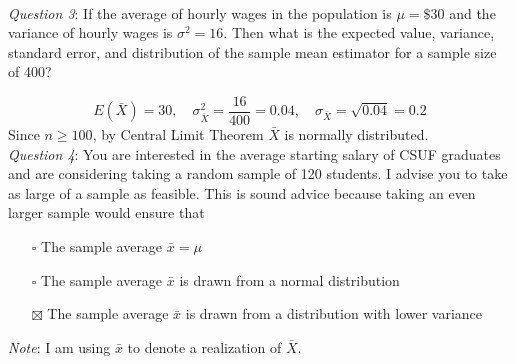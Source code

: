 \documentclass{./../../Latex/handout}
\begin{document}
\newpage
{} \\

\textit{Question 3}: If the average of hourly wages in the population is \( \mu = \$30 \) and the variance of hourly wages is \( \sigma^2 = 16 \). Then what is the expected value, variance, standard error, and distribution of the sample mean estimator for a sample size of 400? 

$$ E(\bar{X}) = 30, \quad \sigma^2_{\bar{X}} = \frac{16}{400} = 0.04, \quad \sigma_{\bar{X}} = \sqrt{0.04} =0.2 $$
Since $n \geq 100$, by Central Limit Theorem $ \bar{X}$ is normally distributed. \\

\textit{Question 4}: You are interested in the average starting salary of CSUF graduates and are considering taking a random sample of 120 students. I advise you to take as large of a sample as feasible. This is sound advice because taking an even larger sample would ensure that \vspace{-1em}
\begin{itemize}
\item[$\square$] The sample average $\bar{x}=\mu$
\item[$\square$] The sample average $\bar{x}$ is drawn from a normal distribution
\item[$\boxtimes$] The sample average $\bar{x}$ is drawn from a distribution with lower variance 
\end{itemize}
\textit{Note}: I am using $\bar{x}$ to denote a realization of $\bar{X}$. \\
\end{document}
